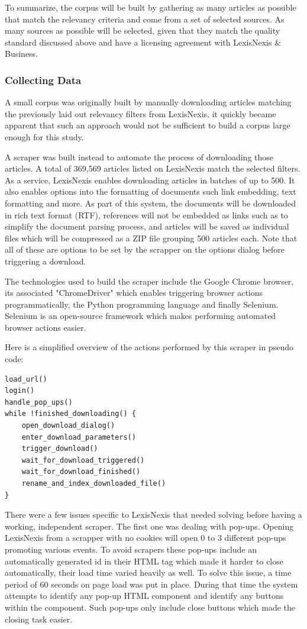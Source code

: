 To summarize, the corpus will be built by gathering as many articles as possible that match the relevancy criteria and come from a set of selected sources. As many sources as possible will be selected, given that they match the quality standard discussed above and have a licensing agreement with LexisNexis \& Business.

\subsubsection{Collecting Data}\label{Collecting Data}

A small corpus was originally built by manually downloading articles matching the previously laid out relevancy filters from LexisNexis, it quickly became apparent that such an approach would not be sufficient to build a corpus large enough for this study.

A scraper was built instead to automate the process of downloading those articles. A total of 369,569 articles listed on LexisNexis match the selected filters. As a service, LexisNexis enables downloading articles in batches of up to 500. It also enables options into the formatting of documents such link embedding, text formatting and more. As part of this system, the documents will be downloaded in rich text format (RTF), references will not be embedded as links such as to simplify the document parsing process, and articles will be saved as individual files which will be compressed as a ZIP file grouping 500 articles each. Note that all of these are options to be set by the scrapper on the options dialog before triggering a download.

The technologies used to build the scraper include the Google Chrome browser, its associated "ChromeDriver" which enables triggering browser actions programmatically, the Python programming language and finally Selenium. Selenium is an open-source framework which makes performing automated browser actions easier.

Here is a simplified overview of the actions performed by this scraper in pseudo code:

\begin{verbatim}
load_url()
login()
handle_pop_ups()
while !finished_downloading() {
    open_download_dialog()
    enter_download_parameters()
    trigger_download()
    wait_for_download_triggered()
    wait_for_download_finished()
    rename_and_index_downloaded_file()
}
\end{verbatim}

There were a few issues specific to LexisNexis that needed solving before having a working, independent scraper. The first one was dealing with pop-ups. Opening LexisNexis from a scrapper with no cookies will open 0 to 3 different pop-ups promoting various events. To avoid scrapers these pop-ups include an automatically generated id in their HTML tag which made it harder to close automatically, their load time varied heavily as well. To solve this issue, a time period of 60 seconds on page load was put in place. During that time the system attempts to identify any pop-up HTML component and identify any buttons within the component. Such pop-ups only include close buttons which made the closing task easier.

